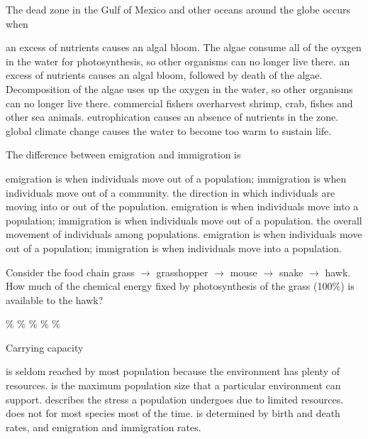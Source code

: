 \question
The dead zone in the Gulf of Mexico and other oceans around the globe occurs when

\begin{choices}
\choice an excess of nutrients causes an algal bloom. The algae consume all of the oyxgen in the water for photosynthesis, so other organisms can no longer live there.
\correctchoice an excess of nutrients causes an algal bloom, followed by death of the algae. Decomposition of the algae uses up the oxygen in the water, so other organisms can no longer live there.
\choice commercial fishers overharvest shrimp, crab, fishes and other sea animals.
\choice eutrophication causes an absence of nutrients in the zone.
\choice global climate change causes the water to become too warm to sustain life.
\end{choices}

\question
The difference between emigration and immigration is

\begin{choices}
\choice emigration is when individuals move out of a population; immigration is when individuals move out of a community.
\choice the direction in which individuals are moving into or out of the population.
\choice emigration is when individuals move into a population; immigration is when individuals move out of a population.
\choice the overall movement of individuals among populations.
\correctchoice emigration is when individuals move out of a population; immigration is when individuals move into a population.
\end{choices}

\question
Consider the food chain grass $\to$ grasshopper $\to$ mouse $\to$ snake $\to$ hawk. How much of the chemical energy fixed by photosynthesis of the grass (100\%) is available to the hawk?

\begin{choices}
\%
\%
\%
\%
\%
\end{choices}

\question
Carrying capacity

\begin{choices}
\choice is seldom reached by most population because the environment has plenty of resources.
\correctchoice is the maximum population size that a particular environment can support.
\choice describes the stress a population undergoes due to limited resources.
\choice does not for most species most of the time.
\choice is determined by birth and death rates, and emigration and immigration rates.
\end{choices}

